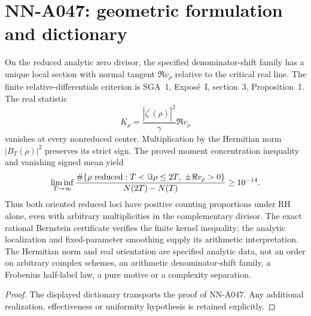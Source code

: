 \section{NN-A047: geometric formulation and dictionary}
\begin{geometricstatement}[NN-A047]
On the reduced analytic zero divisor, the specified denominator-shift family has a unique local section with normal tangent $\Re v_\rho$ relative to the critical real line. The finite relative-differentials criterion is SGA~1, Expos\'e~I, section~3, Proposition~1. The real statistic \[K_\rho=\frac{|\zeta^\prime(\rho)|^2}{\gamma}\Re v_\rho\] vanishes at every nonreduced center. Multiplication by the Hermitian norm $|B_T(\rho)|^2$ preserves its strict sign. The proved moment concentration inequality and vanishing signed mean yield \[\liminf_{T\to\infty}\frac{\#\{\rho\ {\rm reduced}:T<\Im\rho\le2T,\ \pm\Re v_\rho>0\}}{N(2T)-N(T)}\ge10^{-14}.\] Thus both oriented reduced loci have positive counting proportions under RH alone, even with arbitrary multiplicities in the complementary divisor. The exact rational Bernstein certificate verifies the finite kernel inequality; the analytic localization and fixed-parameter smoothing supply its arithmetic interpretation. The Hermitian norm and real orientation are specified analytic data, not an order on arbitrary complex schemes, an arithmetic denominator-shift family, a Frobenius half-label law, a pure motive or a complexity separation.
\end{geometricstatement}
\begin{proof} The displayed dictionary transports the proof of NN-A047. Any additional realization, effectiveness or uniformity hypothesis is retained explicitly.\end{proof}


